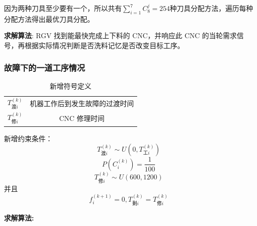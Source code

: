 \documentclass[12pt,a4paper]{article}
\begin{document}
因为两种刀具至少要有一个，所以共有$\sum_{i = 1}^7C_8^j = 254$种刀具分配方法，遍历每种分配方法得出最优刀具分配。

\textbf{求解算法}:
RGV 找到能最快完成上下料的 CNC，并响应此 CNC 的当轮需求信号，再根据实际情况判断是否洗料记忆是否改变目标工序。

\subsubsection{故障下的一道工序情况}
\begin{table}[!htbp]
  \caption{新增符号定义}
  \centering
  \begin{tabular}{c|c}
    \hline
    $T_{\text{渡}i}^{(k)}$ & 机器工作后到发生故障的过渡时间\\
    $T_{\text{修}i}^{(k)}$ & CNC 修理时间\\
    \hline
  \end{tabular}
\end{table}

新增约束条件：
\begin{equation*}
T_{\text{渡}i}^{(k)} \sim U(0,T_{工i}^{(k)})
\end{equation*}
\begin{equation*}
  P(C_i^{(k)}) = \frac{1}{100}
\end{equation*}
$$T_{\text{修}i}^{(k)} \sim U(600,1200)$$
并且 $$f_i^{(k+1)} = 0,T_{\text{剩}i}^{(k)} = T_{\text{修}i}^{(k)}$$

\textbf{求解算法:}
\end{document}
